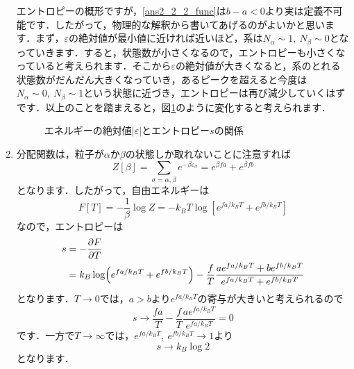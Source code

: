 \documentclass[a4paper,pdflatex,ja=standard]{bxjsarticle}
\begin{document}
\begin{enumerate}
  エントロピーの概形ですが，\eqref{ans2_2_2_func}は$b-a<0$より実は定義不可能です．したがって，物理的な解釈から書いてあげるのがよいかと思います．まず，$\varepsilon$の絶対値が最小値に近ければ近いほど，系は$N_{\alpha}\sim 1,\ N_{\beta}\sim 0$となっていきます．すると，状態数が小さくなるので，エントロピーも小さくなっていると考えられます．そこから$\varepsilon$の絶対値が大きくなると，系のとれる状態数がだんだん大きくなっていき，あるピークを超えると今度は$N_{\alpha}\sim 0,\ N_{\beta}\sim 1$という状態に近づき，エントロピーは再び減少していくはずです．以上のことを踏まえると，図\ref{ans_2_2_2}のように変化すると考えられます．

  \begin{figure}[ht]
    \centering    
    \caption{エネルギーの絶対値$|\varepsilon|$とエントロピー$s$の関係}
    \label{ans_2_2_2}
  \end{figure}


  \item 

  分配関数は，粒子が$\alpha$か$\beta$の状態しか取れないことに注意すれば
  \begin{equation}
    Z[\beta]
    =
    \sum_{\sigma=\alpha,\beta}e^{-\beta \varepsilon_{\sigma}}
    =
    e^{\beta fa}
    +
    e^{\beta fb}
  \end{equation}
  となります．したがって，自由エネルギーは
  \begin{equation}
    F[T]
    =
    -\frac{1}{\beta}\log Z
    =
    -k_BT\log 
    \left[ 
      e^{fa/k_BT}
      +
      e^{fb/k_BT} 
    \right]
  \end{equation}
  なので，エントロピーは
  \begin{align}
    s
    &=
    -\pdv{F}{T}
    \nonumber
    \\
    &=
    k_B\log(e^{fa/k_BT}+e^{fb/k_BT})
    -
    \frac{f}{T}\frac{ae^{fa/k_BT}+be^{fb/k_BT}}{e^{fa/k_BT}+e^{fb/k_BT}}
  \end{align}
  となります．$T\rightarrow0$では，$a>b$より$e^{fa/k_BT}$の寄与が大きいと考えられるので
  \begin{equation}
    s
    \rightarrow
    \frac{fa}{T}
    -
    \frac{f}{T}
    \frac{ae^{fa/k_BT}}{e^{fa/k_BT}}
    =
    0
  \end{equation}
  です．一方で$T\rightarrow\infty$では，$e^{fa/k_BT},\ e^{fb/k_BT}\rightarrow1$より
  \begin{equation}
    s
    \rightarrow
    k_B \log 2
    \label{ans_Tinfinity}
  \end{equation}
  となります．



\end{enumerate}
\end{document}
